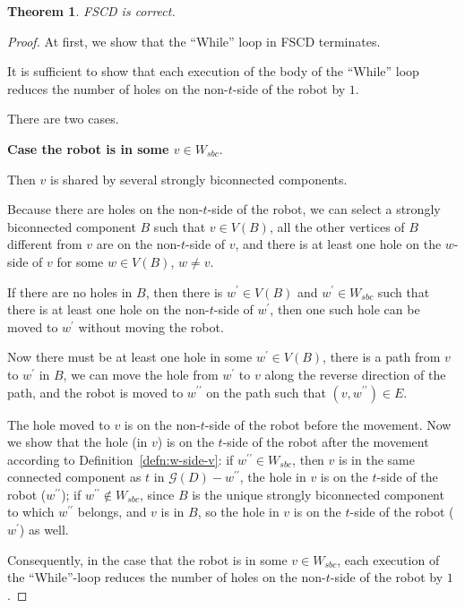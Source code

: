 \documentclass{article}
\newtheorem{thm}{Theorem}
\begin{document}
\begin{thm}
FSCD is correct.
\end{thm}
\begin{proof}

At first, we show that the ``While'' loop in FSCD terminates.

It is sufficient to show that each execution of the body of the
``While'' loop reduces the number of holes on the non-$t$-side of
the robot by $1$.

There are two cases.

\textbf{Case the robot is in some $v \in W_{sbc}$}.

Then $v$ is shared by several strongly biconnected components.

Because there are holes on the non-$t$-side of the robot, we can
select a strongly biconnected component $B$ such that $v \in V(B)$,
all the other vertices of $B$ different from $v$ are on the
non-$t$-side of $v$, and there is at least one hole on the $w$-side
of $v$ for some $w \in V(B)$, $w \ne v$.

If there are no holes in $B$, then there is $w^\prime \in V(B)$ and
$w^\prime \in W_{sbc}$ such that there is at least one hole on the
non-$t$-side of $w^\prime$, then one such hole can be moved to
$w^\prime$ without moving the robot.

Now there must be at least one hole in some $w^\prime \in V(B)$,
there is a path from $v$ to $w^\prime$ in $B$, we can move the hole
from $w^\prime$ to $v$ along the reverse direction of the path, and
the robot is moved to $w^{\prime\prime}$ on the path such that
$(v,w^{\prime\prime}) \in E$.

The hole moved to $v$ is on the non-$t$-side of the robot before the
movement. Now we show that the hole (in $v$) is on the $t$-side of
the robot after the movement according to
Definition~\ref{defn:w-side-v}: if $w^{\prime\prime} \in W_{sbc}$,
then $v$ is in the same connected component as $t$ in
$\mathcal{G}(D)-w^{\prime\prime}$, the hole in $v$ is on the
$t$-side of the robot ($w^{\prime\prime}$); if $w^{\prime\prime}
\not \in W_{sbc}$, since $B$ is the unique strongly biconnected
component to which $w^{\prime\prime}$ belongs, and $v$ is in $B$, so
the hole in $v$ is on the $t$-side of the robot ($w^\prime$) as
well.

Consequently, in the case that the robot is in some $v \in W_{sbc}$,
each execution of the ``While''-loop reduces the number of holes on
the non-$t$-side of the robot by $1$.


\end{proof}
\end{document}
